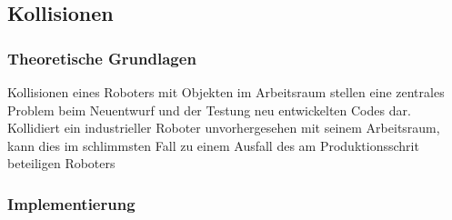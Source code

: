\subsection{Kollisionen}
\subsubsection{Theoretische Grundlagen}

Kollisionen eines Roboters mit Objekten im Arbeitsraum stellen eine zentrales
Problem beim Neuentwurf und der Testung neu entwickelten Codes dar. Kollidiert
ein industrieller Roboter unvorhergesehen mit seinem Arbeitsraum, kann dies im
schlimmsten Fall zu einem Ausfall des am Produktionsschrit beteiligen Roboters
\subsubsection{Implementierung}

